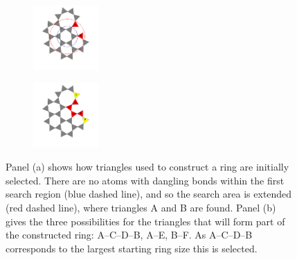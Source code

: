 \begin{figure}[bt]
     \centering
     
     \begin{subfigure}[b]{0.45\textwidth}
         \centering
         \includegraphics[width=2.5cm]{./figures/bilayers/alg_search_1.pdf}
         \vspace{-1mm}
         \caption{}
         \label{fig:triraftalgsearch1}
     \end{subfigure}
     \hfill
	\begin{subfigure}[b]{0.45\textwidth}
         \centering
         \includegraphics[width=2.5cm]{./figures/bilayers/alg_search_2.pdf}
         \caption{}
         \label{fig:triraftalgsearch2}
     \end{subfigure}
     \hfill
     \caption{Panel (a) shows how triangles used to construct a ring are initially selected. There are no atoms with dangling bonds within the first search region (blue dashed line), and so the search area is extended (red dashed line), where triangles A and B are found. Panel (b) gives the three possibilities for the triangles that will form part of the constructed ring: A–C–D–B, A–E, B–F. As A–C–D–B corresponds to the largest starting ring size this is selected.}
     \label{fig:triraftalgsearch}
     

\end{figure}
